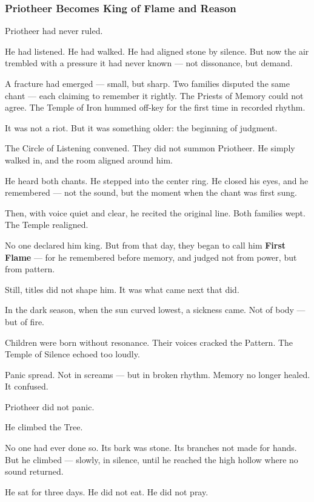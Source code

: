 \documentclass[12pt]{article}
\begin{document}
\dotfill

\subsubsection*{Priotheer Becomes King of Flame and Reason}

Priotheer had never ruled.

He had listened. He had walked. He had aligned stone by silence.  
But now the air trembled with a pressure it had never known — not dissonance, but demand.

A fracture had emerged — small, but sharp.  
Two families disputed the same chant — each claiming to remember it rightly.  
The Priests of Memory could not agree.  
The Temple of Iron hummed off-key for the first time in recorded rhythm.

It was not a riot.  
But it was something older: the beginning of judgment.

The Circle of Listening convened.  
They did not summon Priotheer.  
He simply walked in, and the room aligned around him.

He heard both chants.  
He stepped into the center ring.  
He closed his eyes, and he remembered — not the sound, but the moment when the chant was first sung.

Then, with voice quiet and clear, he recited the original line.  
Both families wept.  
The Temple realigned.

No one declared him king.  
But from that day, they began to call him \textbf{First Flame} —  
for he remembered before memory,  
and judged not from power, but from pattern.

Still, titles did not shape him.  
It was what came next that did.

In the dark season, when the sun curved lowest, a sickness came.  
Not of body — but of fire.

Children were born without resonance.  
Their voices cracked the Pattern.  
The Temple of Silence echoed too loudly.

Panic spread.  
Not in screams — but in broken rhythm.  
Memory no longer healed. It confused.

Priotheer did not panic.

He climbed the Tree.

No one had ever done so.  
Its bark was stone. Its branches not made for hands.  
But he climbed — slowly, in silence, until he reached the high hollow where no sound returned.

He sat for three days.  
He did not eat.  
He did not pray.
\end{document}
